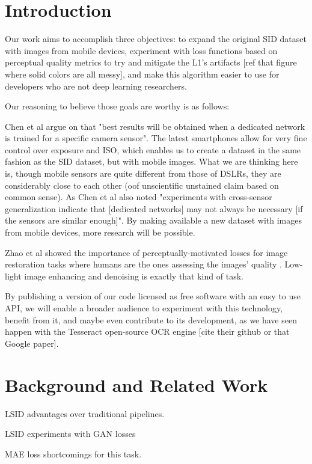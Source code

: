 \chapter{Introduction}
Our work aims to accomplish three objectives: to expand the original SID dataset with images from mobile devices, experiment with loss functions based on perceptual quality metrics to try and mitigate the L1's artifacts [ref that figure where solid colors are all messy], and make this algorithm easier to use for developers who are not deep learning researchers.

Our reasoning to believe those goals are worthy is as follows: 

Chen et al argue on \cite{DBLP:conf/cvpr/ChenCXK18} that "best results will be obtained when a dedicated network is trained for a specific camera sensor".
The latest smartphones allow for very fine control over exposure and ISO, which enables us to create a dataset in the same fashion as the SID dataset, but with mobile images.
What we are thinking here is, though mobile sensors are quite different from those of DSLRs, they are considerably close to each other (oof unscientific unstained claim based on common sense).
As Chen et al also noted "experiments with cross-sensor generalization indicate that [dedicated networks] may not always be necessary [if the sensors are similar enough]".
By making available a new dataset with images from mobile devices, more research will be possible.

Zhao et al showed the importance of perceptually-motivated losses for image restoration tasks where humans are the ones assessing the images' quality \cite{DBLP:journals/tci/ZhaoGFK17}.
Low-light image enhancing and denoising is exactly that kind of task.

By publishing a version of our code licensed as free software with an easy to use API, we will enable a broader audience to experiment with this technology, benefit from it, and maybe even contribute to its development, as we have seen happen with the Tesseract open-source OCR engine [cite their github or that Google paper].


\chapter{Background and Related Work}

LSID advantages over traditional pipelines.

LSID experiments with GAN losses

MAE loss shortcomings for this task.

